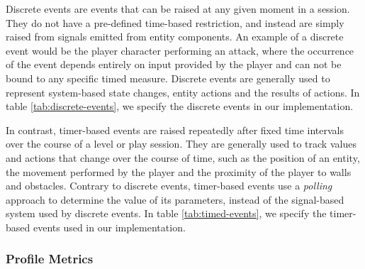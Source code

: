 Discrete events are events that can be raised at any given moment in a session. They do not have a pre-defined time-based restriction, and instead are simply raised from signals emitted from entity components. An example of a discrete event would be the player character performing an attack, where the occurrence of the event depends entirely on input provided by the player and can not be bound to any specific timed measure. Discrete events are generally used to represent system-based state changes, entity actions and the results of actions. In table \ref{tab:discrete-events}, we specify the discrete events in our implementation.



In contrast, timer-based events are raised repeatedly after fixed time intervals over the course of a level or play session. They are generally used to track values and actions that change over the course of time, such as the position of an entity, the movement performed by the player and the proximity of the player to walls and obstacles. Contrary to discrete events, timer-based events use a \emph{polling} approach to determine the value of its parameters, instead of the signal-based system used by discrete events. In table \ref{tab:timed-events}, we specify the timer-based events used in our implementation.

%

\subsubsection{Profile Metrics}





